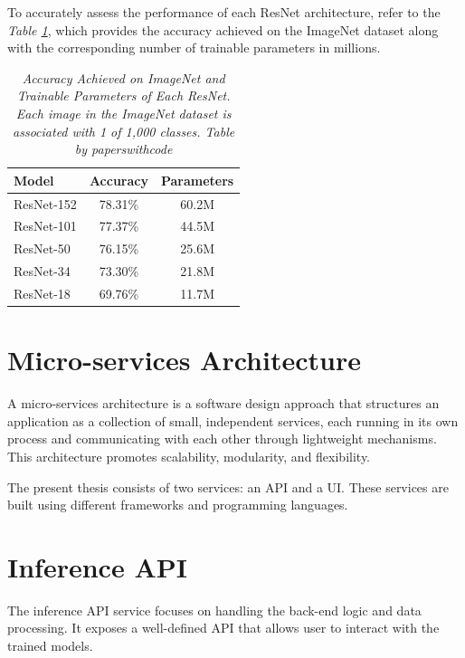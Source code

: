 To accurately assess the performance of each ResNet architecture, refer to the
\textit{Table \ref{table:resnet}}, which provides the accuracy achieved on the
ImageNet dataset along with the corresponding number of trainable parameters in
millions.

\begin{table}[H]
  \centering
  \begin{tabular}{lcc}
    \toprule
    \textbf{Model} & \textbf{Accuracy} & \textbf{Parameters} \\
    \midrule
    ResNet-152 & 78.31\% & 60.2M \\
    ResNet-101 & 77.37\% & 44.5M \\
    ResNet-50 & 76.15\% & 25.6M \\
    ResNet-34 & 73.30\% & 21.8M \\
    ResNet-18 & 69.76\% & 11.7M \\
    \bottomrule
  \end{tabular}
  \caption[Accuracy Achieved on ImageNet and Trainable Parameters of Each ResNet.]
  {\textit{Accuracy Achieved on ImageNet and Trainable Parameters of Each ResNet.
  Each image in the ImageNet dataset is associated with 1 of 1,000 classes. Table by paperswithcode}}
  {\label{table:resnet}}
\end{table}

\section{Micro-services Architecture}

A micro-services architecture is a software design approach that structures an
application as a collection of small, independent services, each running in its
own process and communicating with each other through lightweight mechanisms.
This architecture promotes scalability, modularity, and flexibility. \newline

The present thesis consists of two services: an API and a UI. These services
are built using different frameworks and programming languages.


\section{Inference API}

The inference API service focuses on handling the back-end logic and data
processing. It exposes a well-defined API that allows user to interact with the
trained models. \newline

